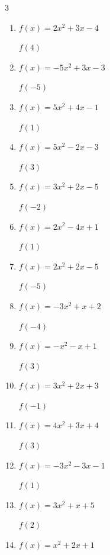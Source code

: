 \begin{multicols}{3}
\begin{enumerate}
$f(4)$
        \phantom{$= -25$}

  \item $f(x)=2x^{2}+3x-4$

$f(4)$
        \phantom{$= 40$}

  \item $f(x)=-5x^{2}+3x-3$

$f(-5)$
        \phantom{$= -143$}

  \item $f(x)=5x^{2}+4x-1$

$f(1)$
        \phantom{$= 8$}

  \item $f(x)=5x^{2}-2x-3$

$f(3)$
        \phantom{$= 36$}

  \item $f(x)=3x^{2}+2x-5$

$f(-2)$
        \phantom{$= 3$}

  \item $f(x)=2x^{2}-4x+1$

$f(1)$
        \phantom{$= -1$}

  \item $f(x)=2x^{2}+2x-5$

$f(-5)$
        \phantom{$= 35$}

\columnbreak %

\resetques

  \item $f(x)=-3x^{2}+x+2$

$f(-4)$
        \phantom{$= -50$}

  \item $f(x)=-x^{2}-x+1$

$f(3)$
        \phantom{$= -11$}

  \item $f(x)=3x^{2}+2x+3$

$f(-1)$
        \phantom{$= 4$}

  \item $f(x)=4x^{2}+3x+4$

$f(3)$
        \phantom{$= 49$}

  \item $f(x)=-3x^{2}-3x-1$

$f(1)$
        \phantom{$= -7$}

  \item $f(x)=3x^{2}+x+5$

$f(2)$
        \phantom{$= 19$}

  \item $f(x)=x^{2}+2x+1$


\end{enumerate}
\end{multicols}
